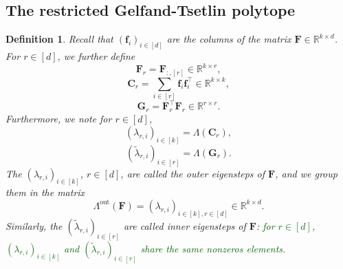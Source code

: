 \documentclass[twoside,11pt]{book}
\newcommand{\rev}[1]{\textcolor{darkgreen}{#1}}
\newtheorem{definition}{Definition}
\numberwithin{theorem}{chapter}
\numberwithin{definition}{chapter}
\numberwithin{proposition}{chapter}
\numberwithin{corollary}{chapter}
\numberwithin{example}{chapter}
\numberwithin{lemma}{chapter}
\numberwithin{assumption}{chapter}
\DeclareMathOperator{\Tran}{\intercal}
\begin{document}
\subsection{The restricted Gelfand-Tsetlin polytope}
\label{s:gt}
\begin{definition}
Recall that $(\bm{f}_{i})_{i \in [d]}$ are the columns of the matrix $\bm{F}\in\mathbb{R}^{k\times d}$. For $r \in [d]$, we further define
\begin{equation}
\bm{F}_{r} = \bm{F}_{:,[r]} \in \mathbb{R}^{k \times r},
\end{equation}
\begin{equation}
\bm{C}_{r} = \sum\limits_{i \in [r]} \bm{f}_{i}\bm{f}_{i}^{\Tran} \in \mathbb{R}^{k \times k},
\end{equation}
\begin{equation}
\bm{G}_{r} = \bm{F}_{r}^{\Tran}\bm{F}_{r} \in \mathbb{R}^{r \times r}.
\end{equation}
Furthermore, we note for $r \in [d]$,
\begin{equation}
    (\lambda_{r,i})_{i \in [k]} = \Lambda(\bm{C}_{r}),
\end{equation}
\begin{equation}
    (\tilde{\lambda}_{r,i})_{i \in [r]} = \Lambda(\bm{G}_{r}).
\end{equation}
The $(\lambda_{r,i})_{i \in [k]}$, $r\in [d]$, are called the outer eigensteps of $\bm{F}$, and we group them in the matrix $$\Lambda^{\text{out}}(\bm{F}) = (\lambda_{r,i})_{i \in [k],r \in [d]} \in \mathbb{R}^{k \times d}.$$ Similarly, the $(\tilde{\lambda}_{r,i})_{i \in [r]}$ are called inner eigensteps of $\bm{F}$: \rev{for $r \in [d]$, $(\lambda_{r,i})_{i \in [k]}$ and $(\tilde{\lambda}_{r,i})_{i \in [r]}$ share the same nonzeros elements.}
\end{definition}
\end{document}
